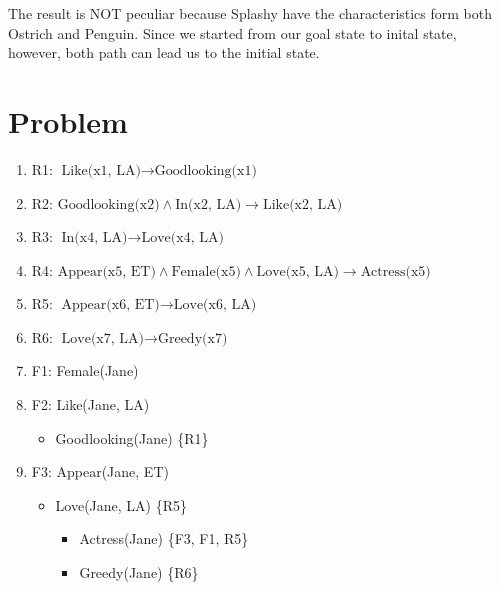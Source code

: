 \documentclass[11pt, oneside]{article}      %
\begin{document}
The result is NOT peculiar because Splashy have the characteristics form both Ostrich and Penguin. Since we started from our goal state to inital state, however, both path can lead us to the initial state.

\section {Problem}
\begin{enumerate}[1. ] %
  \item R1: $\text{Like(x1, LA)} \rightarrow \text{Goodlooking(x1)}$
  \item R2: $\text{Goodlooking(x2)} \land \text{In(x2, LA)} \rightarrow \text{Like(x2, LA)}$
  \item R3: $\text{In(x4, LA)} \rightarrow \text{Love(x4, LA)}$
  \item R4: $\text{Appear(x5, ET)} \land \text{Female(x5)} \land \text{Love(x5, LA)} \rightarrow \text{Actress(x5)}$
  \item R5: $\text{Appear(x6, ET)} \rightarrow \text{Love(x6, LA)}$
  \item R6: $\text{Love(x7, LA)} \rightarrow \text{Greedy(x7)}$
  \item F1: Female(Jane)
  \item F2: Like(Jane, LA)
    \begin{itemize}
      \item Goodlooking(Jane) \{R1\}
    \end{itemize}
  \item F3: Appear(Jane, ET)
    \begin{itemize}
      \item Love(Jane, LA) \{R5\}
        \begin{itemize}
          \item Actress(Jane) \{F3, F1, R5\}
          \item Greedy(Jane) \{R6\}
        \end{itemize}
    \end{itemize}
\end{enumerate}
\end{document}
